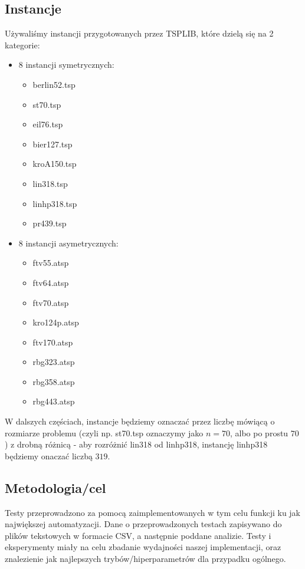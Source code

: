 \documentclass{article}
\begin{document}
\subsection{Instancje}
Używaliśmy instancji przygotowanych przez TSPLIB, które dzielą się na 2 kategorie:
\begin{itemize}
	\item 8 instancji symetrycznych:
		\begin{itemize}
			\item berlin52.tsp
			\item st70.tsp
			\item eil76.tsp
			\item bier127.tsp
			\item kroA150.tsp
			\item lin318.tsp
			\item linhp318.tsp
			\item pr439.tsp
		\end{itemize}
	\item 8 instancji asymetrycznych:
		\begin{itemize}
			\item ftv55.atsp
			\item ftv64.atsp
			\item ftv70.atsp
			\item kro124p.atsp
			\item ftv170.atsp
			\item rbg323.atsp
			\item rbg358.atsp
			\item rbg443.atsp
		\end{itemize}
\end{itemize}

W dalszych częściach, instancje będziemy oznaczać przez liczbę mówiącą o rozmiarze problemu (czyli np. st70.tsp oznaczymy jako $n = 70$, albo po prostu $70$) z drobną różnicą - aby rozróżnić lin318 od linhp318, instancję linhp318 będziemy onaczać liczbą $319$.

\subsection{Metodologia/cel}

Testy przeprowadzono za pomocą zaimplementowanych w tym celu funkcji ku jak największej automatyzacji. Dane o przeprowadzonych testach zapisywano do plików tekstowych w formacie CSV, a następnie poddane analizie. Testy i eksperymenty miały na celu zbadanie wydajności naszej implementacji, oraz znalezienie jak najlepszych trybów/hiperparametrów dla przypadku ogólnego.
\end{document}
